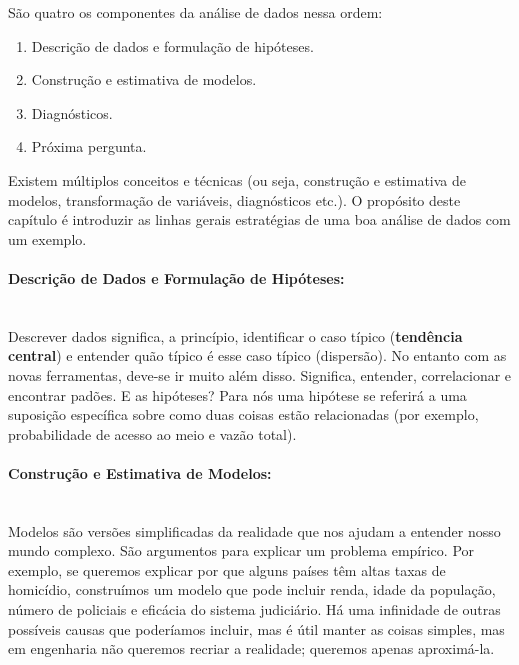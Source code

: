 \documentclass[article]{memoir}
\begin{document}
São quatro os componentes da análise de dados  nessa ordem: 
\begin{enumerate}
	\item Descrição de dados e formulação de hipóteses.
	\item Construção e estimativa de modelos. 
	\item Diagnósticos.
	\item Próxima pergunta. 
\end{enumerate}

	Existem múltiplos conceitos e técnicas (ou seja, construção e estimativa de modelos, transformação de variáveis, diagnósticos etc.). O propósito deste capítulo é introduzir as linhas gerais estratégias de uma boa análise de dados com um exemplo. 

\paragraph*{Descrição de Dados e Formulação de Hipóteses:}\mbox{}\\

Descrever dados significa, a princípio, identificar o caso típico (\textbf{tendência central}) e entender quão típico é esse caso típico (dispersão). No entanto com as novas ferramentas, deve-se ir muito além disso. Significa, entender, correlacionar e encontrar padões.
E as hipóteses? Para nós uma hipótese se referirá a uma suposição específica sobre como duas coisas estão relacionadas (por exemplo, probabilidade de acesso ao meio e vazão total). 

\paragraph*{Construção e Estimativa de Modelos:}\mbox{}\\

Modelos são versões simplificadas da realidade que nos ajudam a entender nosso mundo complexo. São argumentos  para explicar um problema empírico. Por exemplo, se queremos explicar por que alguns países têm altas taxas de homicídio, construímos um modelo que pode incluir renda, idade da população, número de policiais e eficácia do sistema judiciário. Há uma infinidade de outras possíveis causas que poderíamos incluir, mas é útil manter as coisas simples, mas em engenharia não queremos recriar a realidade; queremos apenas aproximá-la. 
\end{document}
